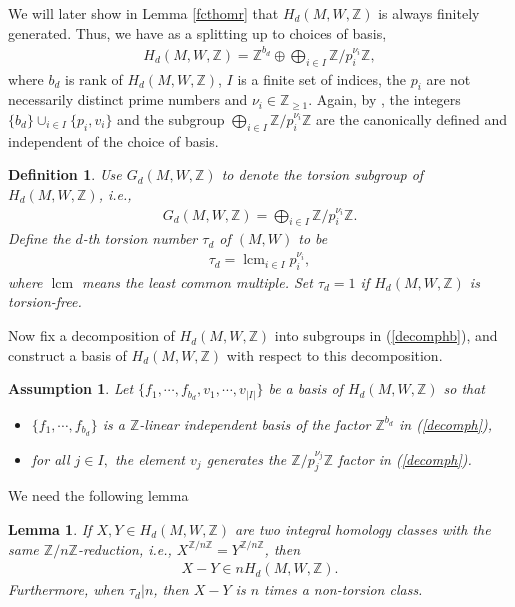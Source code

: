 \documentclass[11pt,a4paper]{amsart}
\numberwithin{equation}{section}
\newcommand{\cd}{\cdots}
\newcommand{\Z}{\mathbb{Z}}
\theoremstyle{plain}
\newtheorem{lem}{Lemma}[subsection]
\newtheorem{assump}{Assumption}[subsection]
\newtheorem{defn}{Definition}[subsection]
\theoremstyle{definition}
\numberwithin{equation}{subsection}
\begin{document}
We will later show in Lemma \ref{fcthomr} that $H_d(M,W,\Z)$ is always finitely generated. 
Thus, we have as a splitting up to choices of basis,
\begin{align}\label{decomphb}
	H_d(M,W,\Z)=\Z^{b_d}\oplus\bigoplus_{i\in I}\Z/p_i^{\nu_i}\Z,
\end{align}where $b_d$ is rank of $H_d(M,W,\Z)$, $I$ is a finite set of indices, the $p_i$ are not necessarily distinct prime numbers and $\nu_i\in \Z_{\ge 1}$. Again, by \cite[Theorem 1.57(c)]{JMgt}, the integers $\{b_d\}\cup_{i\in I}\{p_i,v_i\}$ and the subgroup $\bigoplus_{i\in I}\Z/p_i^{\nu_i}\Z$ are the canonically defined and independent of the choice of basis. \begin{defn}\label{defntmb}
	Use $G_d(M,W,\Z)$ to denote the torsion subgroup of $H_d(M,W,\Z)$, i.e., 
	\begin{align*}
		G_d(M,W,\Z)=\bigoplus_{i\in I}\Z/p_i^{\nu_i}\Z.
	\end{align*}Define the $d$-th torsion number $\tau_d$ of $(M,W)$ to be
	\begin{align*}
		\tau_d=\operatorname{lcm}_{i\in I}p_i^{\nu_i},
	\end{align*}where $\operatorname{lcm}$ means the 
	least common multiple. Set $\tau_d=1$ if $H_d(M,W,\Z)$ is torsion-free. 
\end{defn}
Now fix a decomposition  of $H_d(M,W,\Z)$ into subgroups in (\ref{decomphb}), and construct a basis of $H_d(M,W,\Z)$ with respect to this decomposition. 
	\begin{assump}\label{decompbs}
		Let $\{f_1,\cd,f_{b_d},v_1,\cd,v_{|I|}\}$ be a basis of $H_d(M,W,\Z)$ so that 
		\begin{itemize}
			\item 	$\{f_1,\cd,f_{b_d}\}$ is a $\Z$-linear independent basis of the factor $\Z^{b_d}$ in (\ref{decomph}),
			\item for all $j\in I,$ the element $v_j$ generates the $\Z/p_j^{\nu_j}\Z$ factor in (\ref{decomph}).
		\end{itemize}
	\end{assump}We need the following lemma
	\begin{lem}\label{lemnt}
		If $X,Y\in H_d(M,W,\Z)$ are two integral homology classes with the same $\Z/n\Z$-reduction, i.e., $X^{\Z/n\Z}=Y^{\Z/n\Z}$, then
		\begin{align*}
			X-Y\in nH_d(M,W,\Z).		\end{align*} Furthermore, when $\tau_d|n$, then $X-Y$ is $n$ times a non-torsion class.  
	\end{lem}
\end{document}
